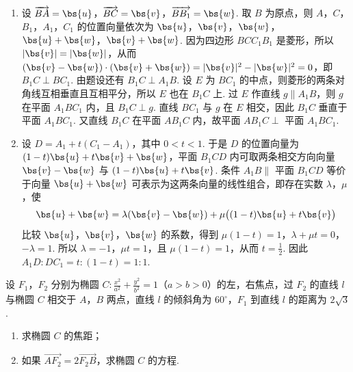 \begin{solution}
\begin{enumerate}
\item 设 \(\overrightarrow{BA}=\bs{u}\)，\(\overrightarrow{BC}=\bs{v}\)，\(\overrightarrow{BB_1}=\bs{w}\). 取 \(B\) 为原点，则 \(A\)，\(C\)，\(B_1\)，\(A_1\)，\(C_1\) 的位置向量依次为 \(\bs{u}\)，\(\bs{v}\)，\(\bs{w}\)，\(\bs{u}+\bs{w}\)，\(\bs{v}+\bs{w}\). 因为四边形 \(BCC_1B_1\) 是菱形，所以 \(|\bs{v}|=|\bs{w}|\)，从而 \((\bs{v}-\bs{w})\cdot(\bs{v}+\bs{w})=|\bs{v}|^2-|\bs{w}|^2=0\)，即 \(B_1C\perp BC_1\). 由题设还有 \(B_1C\perp A_1B\). 设 \(E\) 为 \(BC_1\) 的中点，则菱形的两条对角线互相垂直且互相平分，所以 \(E\) 也在 \(B_1C\) 上. 过 \(E\) 作直线 \(g\parallel A_1B\)，则 \(g\) 在平面 \(A_1BC_1\) 内，且 \(B_1C\perp g\). 直线 \(BC_1\) 与 \(g\) 在 \(E\) 相交，因此 \(B_1C\) 垂直于平面 \(A_1BC_1\). 又直线 \(B_1C\) 在平面 \(AB_1C\) 内，故平面 \(AB_1C\perp\) 平面 \(A_1BC_1\).
\item 设 \(D=A_1+t(C_1-A_1)\)，其中 \(0<t<1\). 于是 \(D\) 的位置向量为 \((1-t)\bs{u}+t\bs{v}+\bs{w}\)，平面 \(B_1CD\) 内可取两条相交方向向量 \(\bs{v}-\bs{w}\) 与 \((1-t)\bs{u}+t\bs{v}\). 条件 \(A_1B\parallel\) 平面 \(B_1CD\) 等价于向量 \(\bs{u}+\bs{w}\) 可表示为这两条向量的线性组合，即存在实数 \(\lambda\)，\(\mu\)，使
\[
\bs{u}+\bs{w}=\lambda(\bs{v}-\bs{w})+\mu\bigl((1-t)\bs{u}+t\bs{v}\bigr)
\]
比较 \(\bs{u}\)，\(\bs{v}\)，\(\bs{w}\) 的系数，得到 \(\mu(1-t)=1\)，\(\lambda+\mu t=0\)，\(-\lambda=1\). 所以 \(\lambda=-1\)，\(\mu t=1\)，且 \(\mu(1-t)=1\)，从而 \(t=\frac{1}{2}\). 因此 \(A_1D:DC_1=t:(1-t)=1:1\).
\end{enumerate}
\end{solution}

\begin{problem}
设 \(F_1\)，\(F_2\) 分别为椭圆 \(C:\frac{x^2}{a^2}+\frac{y^2}{b^2}=1\)（\(a>b>0\)）的左，右焦点，过 \(F_2\) 的直线 \(l\) 与椭圆 \(C\) 相交于 \(A\)，\(B\) 两点，直线 \(l\) 的倾斜角为 \(60^\circ\)，\(F_1\) 到直线 \(l\) 的距离为 \(2\sqrt{3}\).

\begin{enumerate}
\item 求椭圆 \(C\) 的焦距；
\item 如果 \(\overrightarrow{AF_2}=2\overrightarrow{F_2B}\)，求椭圆 \(C\) 的方程.
\end{enumerate}
\end{problem}

